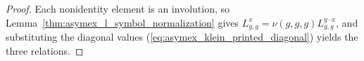 \begin{proof}
    \leanok
    Each nonidentity element is an involution, so
    Lemma~\ref{thm:asymex_l_symbol_normalization} gives
    $L^x_{g,g}=\nu(g,g,g)L^{g\cdot x}_{g,g}$, and substituting the diagonal
    values (\ref{eq:asymex_klein_printed_diagonal}) yields the three relations.
\end{proof}
